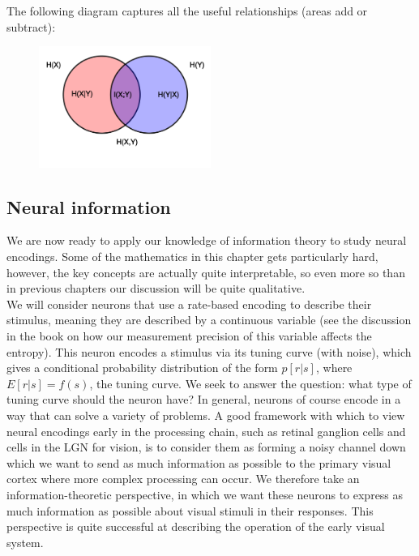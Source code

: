 \documentclass{article}
\begin{document}
The following diagram captures all the useful relationships (areas add or subtract):

\begin{figure}[h] %
	\centering %
	\includegraphics[width=0.5\textwidth]{entropy.png} %
\end{figure}

\subsection{Neural information}

We are now ready to apply our knowledge of information theory to study neural encodings. Some of the mathematics in this chapter gets particularly hard, however, the key concepts are actually quite interpretable, so even more so than in previous chapters our discussion will be quite qualitative.\\

We will consider neurons that use a rate-based encoding to describe their stimulus, meaning they are described by a continuous variable (see the discussion in the book on how our measurement precision of this variable affects the entropy). This neuron encodes a stimulus via its tuning curve (with noise), which gives a conditional probability distribution of the form $p[r|s]$, where $E[r|s]=f(s)$, the tuning curve. We seek to answer the question: what type of tuning curve should the neuron have? In general, neurons of course encode in a way that can solve a variety of problems. A good framework with which to view neural encodings early in the processing chain, such as retinal ganglion cells and cells in the LGN for vision, is to consider them as forming a noisy channel down which we want to send as much information as possible to the primary visual cortex where more complex processing can occur. We therefore take an information-theoretic perspective, in which we want these neurons to express as much information as possible about visual stimuli in their responses. This perspective is quite successful at describing the operation of the early visual system.\\
\end{document}
